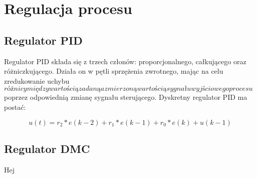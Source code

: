 \chapter{Regulacja procesu}

\section{Regulator PID}
Regulator PID składa się z trzech członów: proporcjonalnego, całkującego oraz różniczkującego. Działa on w pętli sprzężenia zwrotnego, mając na celu zredukowanie uchybu \(różnicy między wartością zadaną a zmierzoną wartością sygnału wyjściowego procesu\) poprzez odpowiednią zmianę sygnału sterującego.
Dyskretny regulator PID ma postać:

\begin{equation}
u(t)=r_2*e(k-2)+r_1*e(k-1)+r_0*e(k)+u(k-1)
\end{equation}

\section{Regulator DMC}
Hej
